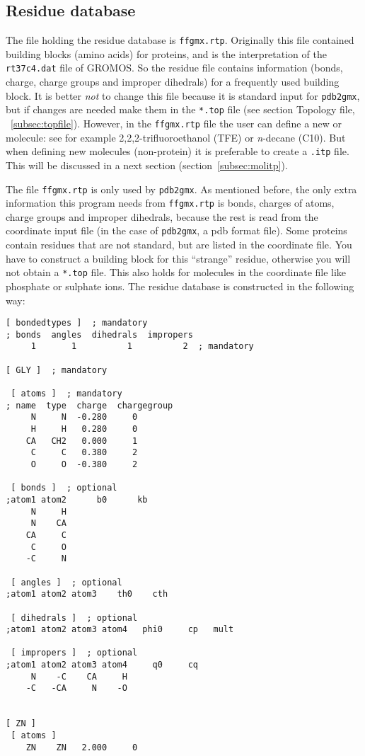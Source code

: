 \subsection{Residue database}
\label{subsec:rtp}
The file holding the residue database is {\tt ffgmx.rtp}. Originally
this file contained building blocks (amino acids) for proteins, and is
the {\gromacs} interpretation of the {\tt rt37c4.dat} file of GROMOS. So
the residue file contains information (bonds, charge, charge groups
and improper dihedrals) for a frequently used building block. It is
better {\em not} to change this file because it is standard input for
\verb'pdb2gmx', but if changes are needed make them in the
\verb'*.top' file (see section Topology file, ~\ref{subsec:topfile}). 
However, in the {\tt ffgmx.rtp} file the user can define a new
 or molecule: see for example 2,2,2-trifluoroethanol
(TFE) or {\em n}-decane (C10). But when defining new molecules
(non-protein) it is preferable to create a {\tt *.itp}
file. This will be discussed in a next section (section~\ref{subsec:molitp}).

The file {\tt ffgmx.rtp} is only used by \verb'pdb2gmx'.
As mentioned before, the only extra information this
program needs from {\tt ffgmx.rtp} is bonds, charges of atoms,
charge groups and improper dihedrals, because the rest is read from
the coordinate input file (in the case of \verb'pdb2gmx', a pdb format
file). Some proteins contain residues that are not standard, but are
listed in the coordinate file. You have to construct a building block
for this ``strange'' residue, otherwise you will not obtain a
\verb'*.top' file. This also holds for molecules in the
coordinate file like phosphate or sulphate ions.
The residue database is constructed in the following way:
{\small\begin{verbatim}
[ bondedtypes ]  ; mandatory
; bonds  angles  dihedrals  impropers
     1       1          1          2  ; mandatory

[ GLY ]  ; mandatory

 [ atoms ]  ; mandatory 
; name  type  charge  chargegroup 
     N     N  -0.280     0
     H     H   0.280     0
    CA   CH2   0.000     1
     C     C   0.380     2
     O     O  -0.380     2

 [ bonds ]  ; optional
;atom1 atom2      b0      kb
     N     H
     N    CA
    CA     C
     C     O
    -C     N

 [ angles ]  ; optional
;atom1 atom2 atom3    th0    cth

 [ dihedrals ]  ; optional
;atom1 atom2 atom3 atom4   phi0     cp   mult

 [ impropers ]  ; optional
;atom1 atom2 atom3 atom4     q0     cq
     N    -C    CA     H
    -C   -CA     N    -O


[ ZN ]
 [ atoms ]
    ZN    ZN   2.000     0
\end{verbatim}}

